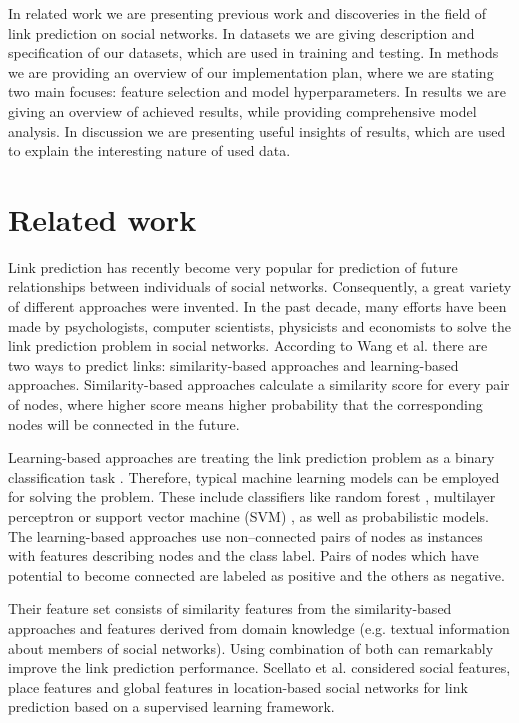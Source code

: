 \documentclass[9pt,twocolumn,twoside]{pnas-new}
\begin{document}
In related work we are presenting previous work and discoveries in the field of link prediction on social networks. In datasets we are giving description and specification of our datasets, which are used in training and testing. In methods we are providing an overview of our implementation plan, where we are stating two main focuses: feature selection and model hyperparameters. In results we are giving an overview of achieved results, while providing comprehensive model analysis. In discussion we are presenting useful insights of results, which are used to explain the interesting nature of used data.



\section*{Related work}

Link prediction has recently become very popular for prediction of future relationships between individuals of social networks. Consequently, a great variety of different approaches were invented. In the past decade, many efforts have been made by psychologists, computer scientists, physicists and economists to solve the link prediction problem in social networks. According to Wang et al. \cite{WangSurvey2015} there are two ways to predict links: similarity-based approaches and learning-based approaches. Similarity-based approaches calculate a similarity score for every pair of nodes, where higher score means higher probability that the corresponding nodes will be connected in the future. 

Learning-based approaches are treating the link prediction problem as a binary classification task \cite{Hasan2006}. Therefore, typical machine learning models can be employed for solving the problem. These include classifiers like random forest \cite{RandomForest}, multilayer perceptron or support vector machine (SVM) \cite{SVM}, as well as probabilistic models. The learning-based approaches use non--connected pairs of nodes as instances with features describing nodes and the class label. Pairs of nodes which have potential to become connected are labeled as positive and the others as negative. 

Their feature set consists of similarity features from the similarity-based approaches and features derived from domain knowledge (e.g. textual information about members of social networks). Using combination of both can remarkably improve the link prediction performance. Scellato et al. \cite{Scellato2011} considered social features, place features and global features in location-based social networks for link prediction based on a supervised learning framework.
\end{document}

